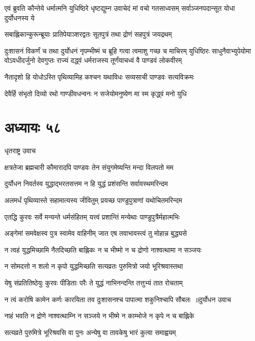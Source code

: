 \threelineshloka
{एवं ब्रुवति कौन्तेये धर्मात्मनि युधिष्ठिरे}
{धृष्टद्युम्न उवाचेदं मां वचो गतसाध्वसम्}
{सर्वाञ्जनपदान्सूत योधा दुर्योधनस्य ये}


\twolineshloka
{सबाह्लिकान्कुरून्ब्रूयाः प्रातिपेयाञ्शरद्वतः}
{सूतपुत्रं तथा द्रोणं सहपुत्रं जयद्रथम्}


दुःशासनं विकर्णं च तथा दुर्योधनं नृपम्भीष्मं च ब्रूहि गत्वा त्वमाशु गच्छ च माचिरम्
\twolineshloka
{युधिष्ठिरः साधुनैवाभ्युपेयोमा वोऽवधीदर्जुनो देवगुप्तः}
{राज्यं दद्ध्वं धर्मराजस्य तूर्णंयाचध्वं वै पाण्डवं लोकवीरम्}


\twolineshloka
{नैतादृशो हि योधोऽस्ति पृथिव्यामिह कश्चन}
{यथाविधः सव्यसाची पाण्डवः सत्यविक्रमः}


\twolineshloka
{देवैर्हि संभृतो दिव्यो रथो गाण्डीवधन्वनः}
{न सजेयोमनुष्येण मा स्म कृद्ध्वं मनो युधि}


\chapter{अध्यायः ५८}
\twolineshloka
{धृतराष्ट्र उवाच}
{}


\twolineshloka
{क्षत्रतेजा ब्रह्मचारी कौमारादपि पाण्डवः}
{तेन संयुगमेष्यन्ति मन्दा विलपतो मम}


\twolineshloka
{दुर्योधन निवर्तस्व युद्धाद्भरतसत्तम}
{न हि युद्धं प्रशंसन्ति सर्वावस्थमरिन्दम}


\twolineshloka
{अलमर्धं पृथिव्यास्ते सहामात्यस्य जीवितुम्}
{प्रयच्छ पाण्डुपुत्राणां यथोचितमरिन्दम}


\twolineshloka
{एतद्धि कुरवः सर्वे मन्यन्ते धर्मसंहितम्}
{यत्त्वं प्रशान्तिं मन्येथाः पाण्डुपुत्रैर्महात्मभिः}


\twolineshloka
{अङ्गेमां समवेक्षस्व पुत्र स्वामेव वाहिनीम्}
{जात एष तवाभावस्त्वं तु मोहान्न बुद्ध्यसे}


\twolineshloka
{न त्वहं युद्धमिच्छामि नैतदिच्छति बाह्लिकः}
{न च भीष्मो न च द्रोणो नाश्वत्थामा न सञ्जयः}


\twolineshloka
{न सोमदत्तो न शलो न कृपो युद्धमिच्छति}
{सत्यव्रतः पुरुमित्रो जयो भूरिश्रवास्तथा}


\twolineshloka
{येषु संप्रतितिष्ठेयुः कुरवः पीडिताः परैः}
{ते युद्धं नाभिनन्दन्ति तत्तुभ्यं तात रोचताम्}


\threelineshloka
{न त्वं करोषि कामेन कर्णः कारयिता तव}
{दुःशासनश्च पापात्मा शकुनिश्चापि सौबलः ॥दुर्योधन उवाच}
{}


\twolineshloka
{नाहं भवति न द्रोणे नाश्वत्थाम्नि न सञ्जये}
{न भीष्मे न काम्भोजे न कृपे न च बाह्लिके}


\twolineshloka
{सत्यव्रते पुरुमित्रे भूरिश्रवसि वा पुनः}
{अन्येषु वा तावकेषु भारं कुत्वा समाह्वयम्}


